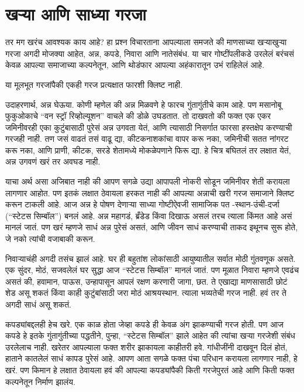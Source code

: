 \chapter{खऱ्या आणि साध्या गरजा}

तर मग खरंच आवश्यक काय आहे? हा प्रश्न विचारताना आपल्याला समजते की माणसाच्या खऱ्याखुऱ्या गरजा अगदी मोजक्या आहेत,  अन्न, कपडे, निवारा आणि नातेसंबंध. या चार गोष्टींपलीकडे उरलेलं बरंचसं केवळ आपल्या समाजाच्या कल्पनेतून, आणि थोडंफार आपल्या अहंकारातून उभं राहिलेलं आहे.

या मूलभूत गरजांपैकी एकही गरज प्रत्यक्षात फारशी क्लिष्ट नाही.

उदाहरणार्थ, अन्न घेऊया. कोणी म्हणेल की अन्न मिळवणे हे फारच गुंतागुंतीचे काम आहे. पण मसानोबू फुकुओकाचे “वन स्ट्रॉ रिव्होल्यूशन” वाचले की डोळे उघडतात. तो दाखवतो की फक्त एक एकर जमिनीवरही एका कुटुंबासाठी पुरेसं अन्न उगवता येतं, आणि त्यासाठी निसर्गात फारसा हस्तक्षेप करण्याची गरजही नाही. तण जसं वाढतं तसं वाढू द्या, कीटकनाशकांचा वापर करू नका, जमिनीची सतत नांगरट करू नका, आणि प्राणी, कीटक, सरडे शेतामध्ये मोकळेपणाने फिरू द्या. हे चित्र बघितलं तर लक्षात येतं,  अन्न उगवणं खरं तर अवघड नाही.

याचा अर्थ असा अजिबात नाही की आपण सगळे उद्या आपापली नोकरी सोडून जमिनीवर शेती करायला लागणार आहोत. पण इतकं लक्षात ठेवायला हरकत नाही की आपल्या अन्नाची खरी गरज समाजाने क्लिष्ट करून टाकली आहे. आज अन्न हे पोषण देणाऱ्या साध्या गोष्टीऐवजी  सामाजिक पत -स्थान-उंची-दर्जा (“स्टेटस सिम्बॉल”) बनलं आहे. अन्न महागडं, ब्रँडेड किंवा दिखाऊ असलं तरच त्याला किंमत आहे असं मानलं जातं. पण खरं म्हणजे साधं अन्न पुरेसं असतं, आणि जीवन साधं करण्याची ताकद इथूनच सुरू होते, जे नको त्यांची वजाबाकी करून.

निवाऱ्याचंही अगदी तसंच झालं आहे. घर ही बहुतांश लोकांसाठी आयुष्यातील सर्वात मोठी गुंतवणूक असते. एक सुंदर, मोठं, सजवलेलं घर सुद्धा आज “स्टेटस सिम्बॉल” मानलं जातं. पण मूळात निवारा म्हणजे एवढंच असतं  की,  हवामान, पाऊस, उन्हापासून आपलं रक्षण करणारी जागा, छत. ते एखाद्या माणसासाठी छोटं शेड असू शकतं किंवा काही कुटुंबांसाठी जरा मोठं आश्रयस्थान. त्याला भव्यतेची गरज नाही. हवं तर ते अगदी साधं असू शकतं.

कपड्यांबद्दलही हेच खरे. एक काळ होता जेव्हा कपडे ही केवळ अंग झाकण्याची गरज होती. पण आज कपडे हे इतके गुंतागुंतीच्या पद्धतीने, पुन्हा, “स्टेटस सिम्बॉल” झाले आहेत की त्यांचा खऱ्या गरजेशी संबंध उरलेलाच नाही. खरेतर आपल्याला फक्त शरीर झाकायला काहीतरी हवे. गांधीजींनी दाखवून दिलं होतं,  हाताने कातलेलं साधं कापड पुरेसं आहे. आपण आता सगळे फक्त पंचा परिधान करायला लागणार नाही, हे खरं. पण किमान हे लक्षात ठेवायला हवं की आपल्या कपड्यांपैकी किती गरजेपुरतं आहे आणि किती फक्त कल्पनेतून निर्माण झालंय.

